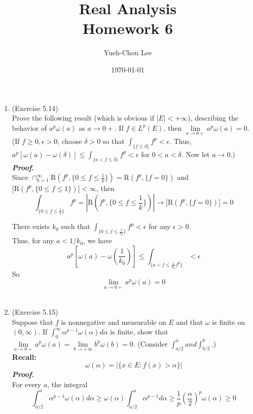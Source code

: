 \documentclass[a4paper,11pt]{article}
\title{Real Analysis \\ Homework 6}
\author{Yueh-Chou Lee}
\date{\today}
\begin{document}
\maketitle
\begin{enumerate}

\item (Exercise 5.14)\\
 Prove the following result (which is obvious if $|E| < +\infty$), describing the behavior of $a^p \omega (a)$ as $a \to 0+$. If $f \in L^p(E)$, then $\underset{a \to 0+}{\lim} a^p \omega(a) = 0$. (If $f \geq 0, \epsilon > 0$, choose $\delta > 0$ so that $\int_{\{ f \leq \delta \}} f^p < \epsilon$. Thus, $a^p [ \omega(a) - \omega(\delta) ] \leq \int_{\{ a < f \leq \delta \}} f^p < \epsilon$ for $0 < a < \delta$. Now let $a \to 0$.)\\
 \newline
 \textit{\textbf {Proof.}}\\
 
 Since $\cap_{k=1}^{\infty} \mathrm{R}(f^p, \{ 0 \leq f \leq \frac{1}{k} \}) = \mathrm{R} (f^p, \{ f = 0 \})$ and $|\mathrm{R} (f^p, \{ 0 \leq f \leq 1 \})| < \infty$, then
 $$\int_{\{ 0 \leq f \leq \frac{1}{k} \}} f^p
 = |\mathrm{R}(f^p, \{ 0 \leq f \leq \frac{1}{k} \})|
 \to |\mathrm{R}(f^p, \{ f = 0 \})| = 0$$

 There exists $k_0$ such that $\int_{\{ 0 \leq f \leq \frac{1}{k_0}\}} f^p < \epsilon$ for any $\epsilon > 0$.\\
 Thus, for any $a < 1/k_0$, we have
 $$a^p [\omega(a) - \omega(\frac{1}{k_0})]
 \leq \int_{\{ a < f \leq \frac{1}{k_0} f^p \}}
 < \epsilon$$
 So $$\underset{a \to 0+}{\lim} a^p \omega(a) = 0$$\






\item (Exercise 5.15)\\
 Suppose that $f$ is nonnegative and measurable on $E$ and that $\omega$ is finite on $(0, \infty)$. If $\int_{0}^{\infty} \alpha^{p-1} \omega(\alpha) d\alpha$ is finite, show that $\underset{a \to 0+}{\lim} a^p \omega(a) = \underset{b \to +\infty}{\lim} b^p \omega(b) = 0$. (Consider $\int_{a/2}^{a} and \int_{b/2}^{b}$.)\\
 \textbf{Recall:}\\
 $$\omega(\alpha) = |\{ x \in E : f(x) > \alpha \}|$$
 \newline
 \textit{\textbf {Proof.}}\\

 For every $a$, the integral
 $$\int_{a/2}^{a} \alpha^{p-1} \omega (\alpha) d \alpha \geq \omega (\alpha) \int_{a/2}^{a} \alpha^{p-1} d \alpha \geq \frac{1}{p} \left( \frac{\alpha}{2} \right)^p \omega(\alpha) \geq 0$$


\end{enumerate}
\end{document}
